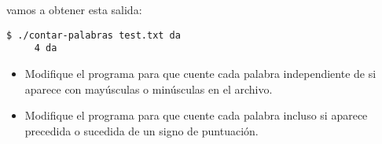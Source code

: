 vamos a obtener esta salida:

\begin{lstlisting}
$ ./contar-palabras test.txt da
     4 da
\end{lstlisting}

\begin{itemize}
\item
  Modifique el programa para que cuente cada palabra independiente de si
  aparece con mayúsculas o minúsculas en el archivo.
\item
  Modifique el programa para que cuente cada palabra incluso si aparece
  precedida o sucedida de un signo de puntuación.
\end{itemize}
